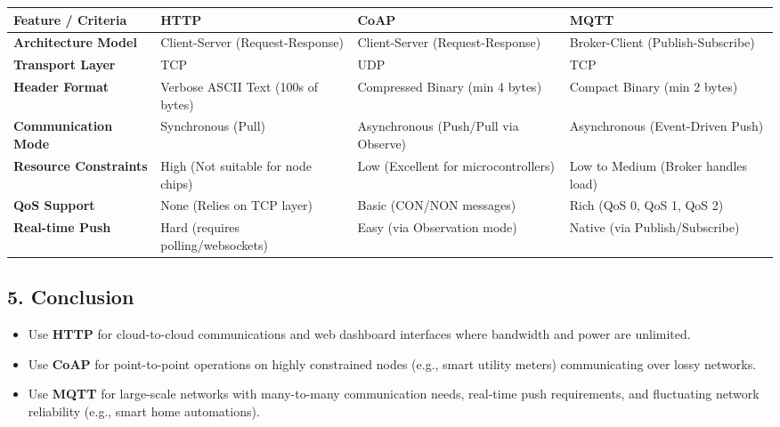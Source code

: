 \begin{table}[H]
\centering
\begin{tabular}{|p{}|p{}|p{}|p{}|}
\hline
Feature / Criteria & HTTP & CoAP & MQTT \\
\hline
\textbf{Architecture Model} & Client-Server (Request-Response) & Client-Server (Request-Response) & Broker-Client (Publish-Subscribe) \\
\hline
\textbf{Transport Layer} & TCP & UDP & TCP \\
\hline
\textbf{Header Format} & Verbose ASCII Text (100s of bytes) & Compressed Binary (min 4 bytes) & Compact Binary (min 2 bytes) \\
\hline
\textbf{Communication Mode} & Synchronous (Pull) & Asynchronous (Push/Pull via Observe) & Asynchronous (Event-Driven Push) \\
\hline
\textbf{Resource Constraints} & High (Not suitable for node chips) & Low (Excellent for microcontrollers) & Low to Medium (Broker handles load) \\
\hline
\textbf{QoS Support} & None (Relies on TCP layer) & Basic (CON/NON messages) & Rich (QoS 0, QoS 1, QoS 2) \\
\hline
\textbf{Real-time Push} & Hard (requires polling/websockets) & Easy (via Observation mode) & Native (via Publish/Subscribe) \\
\hline
\end{tabular}
\end{table}


\subsection{5. Conclusion}
\begin{itemize}
  \item   Use \textbf{HTTP} for cloud-to-cloud communications and web dashboard interfaces where bandwidth and power are unlimited.
  \item   Use \textbf{CoAP} for point-to-point operations on highly constrained nodes (e.g., smart utility meters) communicating over lossy networks.
  \item   Use \textbf{MQTT} for large-scale networks with many-to-many communication needs, real-time push requirements, and fluctuating network reliability (e.g., smart home automations).
\end{itemize}


